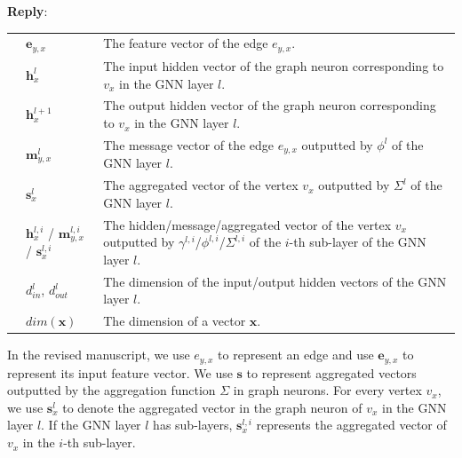 \documentclass[12pt]{article}
\newcommand{\MyVec}[1]{\boldsymbol{#1}}
\newenvironment{reply}
   {\medskip \noindent \textbf{Reply}:\  }
   {\medskip}
\begin{document}
\begin{reply}
\begin{table}[H]
\begin{tabular}{p{3em}lp{35em}}
            & $\boldsymbol{e}_{y,x}$ & The feature vector of the edge $e_{y,x}$.  \\
            & $\boldsymbol{h}_x^{l}$ &  The {input} hidden vector of the graph neuron corresponding to $v_x$ in the GNN layer $l$. \\
            & $\boldsymbol{h}_x^{l+1}$ &  The {output} hidden vector of the graph neuron corresponding to $v_x$ in the GNN layer $l$.\\
            & $\boldsymbol{m}_{y,x}^l$ & The message vector of the edge $e_{y,x}$ outputted by $\phi^l$ of the GNN layer $l$. \\
            & $\boldsymbol{s}_{x}^l$ & The aggregated vector of the vertex $v_x$ outputted by $\Sigma^l$ of the GNN layer $l$. \\
            & $\boldsymbol{h}_{x}^{l,i}$ / $\boldsymbol{m}_{y,x}^{l,i}$ / $\boldsymbol{s}_{x}^{l,i}$ & The hidden/message/aggregated vector of the vertex $v_x$ outputted by $\gamma^{l,i}$/$\phi^{l,i}$/$\Sigma^{l,i}$ of the $i$-th sub-layer of the GNN layer $l$. \\
            & $d^l_{in}$, $d^l_{out}$ &  The dimension of the input/output hidden vectors of the GNN layer $l$. \\
            & $dim(\MyVec{x})$ & The dimension of a vector $\MyVec{x}$. \\
            \bottomrule
        \end{tabular}
\end{table}

    
    In the revised manuscript, we use $e_{y,x}$ to represent an edge and use $\boldsymbol{e}_{y,x}$ to represent its input feature vector.
    We use $\boldsymbol{s}$ to represent aggregated vectors outputted by the aggregation function $\Sigma$ in graph neurons.
    For every vertex $v_x$, we use $\boldsymbol{s}^l_x$ to denote the aggregated vector in the graph neuron of $v_x$ in the GNN layer $l$.
    If the GNN layer $l$ has sub-layers, $\boldsymbol{s}^{l,i}_x$ represents the aggregated vector of $v_x$ in the $i$-th sub-layer.
    

\end{reply}
\end{document}
